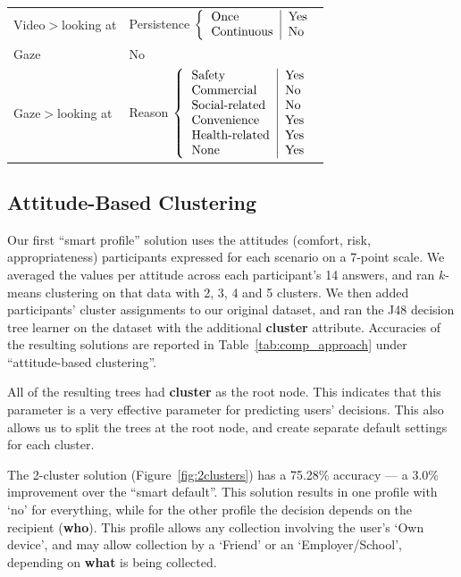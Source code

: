 \begin{table}
\begin{tabular}{ l | l }
		Video$>$looking at 	& Persistence
		$\left\{
		\begin{tabular}{l | l}
		Once & Yes \\
		Continuous & No \\
		\end{tabular}\right.$ \\
		Gaze 				& No			\\
		Gaze$>$looking at 	& Reason
		$\left\{
		\begin{tabular}{l | l}
		Safety & Yes \\
		Commercial & No \\
		Social-related & No \\
		Convenience & Yes \\
		Health-related & Yes \\
		None & Yes \\
		\end{tabular}\right.$ \\
		\hline
	\end{tabular}
\end{table}


\subsection{Attitude-Based Clustering}
Our first ``smart profile'' solution uses the attitudes (comfort, risk, appropriateness) participants expressed for each scenario on a 7-point scale. We averaged the values per attitude across each participant's 14 answers, and ran $k$-means clustering on that data with 2, 3, 4 and 5 clusters. We then added participants' cluster assignments to our original dataset, and ran the J48 decision tree learner on the dataset with the additional \textbf{cluster} attribute. Accuracies of the resulting solutions are reported in Table~\ref{tab:comp_approach} under ``attitude-based clustering''.


All of the resulting trees had \textbf{cluster} as the root node. This indicates that this parameter is a very effective parameter for predicting users' decisions. This also allows us to split the trees at the root node, and create separate default settings for each cluster.

The 2-cluster solution (Figure~\ref{fig:2clusters}) has a 75.28\% accuracy --- a 3.0\% improvement over the ``smart default''. This solution results in one profile with `no' for everything, while for the other profile the decision depends on the recipient (\textbf{who}). This profile allows any collection involving the user's `Own device', and may allow collection by a `Friend' or an `Employer/School', depending on \textbf{what} is being collected.

